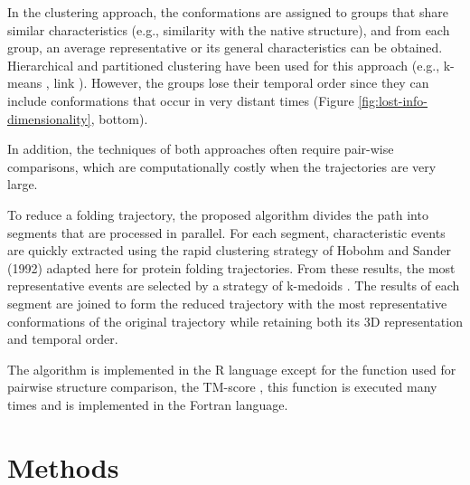 \documentclass[twocolumn]{bmcart}%
\begin{document}
In the clustering approach, the conformations are assigned to groups that share similar characteristics (e.g., similarity with the native structure), and from each group, an average representative or its general characteristics can be obtained. Hierarchical and partitioned clustering have been used for this approach (e.g., k-means \cite{Doerr2017}, link \cite{Shao2007}). However, the groups lose their temporal order since they can include conformations that occur in very distant times (Figure \ref{fig:lost-info-dimensionality}, bottom).

In addition, the techniques of both approaches often require pair-wise comparisons, which are computationally costly when the trajectories are very large.

%

To reduce a folding trajectory, the proposed algorithm divides the path into segments that are processed in parallel. For each segment, characteristic events are quickly extracted using the rapid clustering strategy of Hobohm and Sander (1992) adapted here for protein folding trajectories. From these results, the most representative events are selected by a strategy of k-medoids \cite{Kaufman1990}. The results of each segment are joined to form the reduced trajectory with the most representative conformations of the original trajectory while retaining both its 3D representation and temporal order.

The algorithm is implemented in the R language except for the function used for pairwise structure comparison, the TM-score \cite{Zhang2004}, this function is executed many times and is implemented in the Fortran language.

\section*{Methods}
\end{document}
